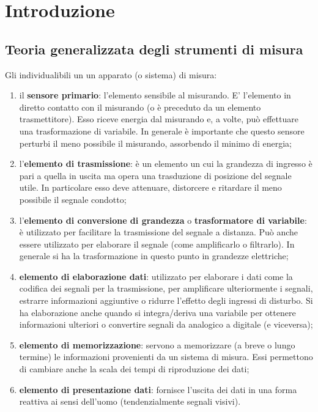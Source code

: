 \chapter{Introduzione}
	
	
	
\section{Teoria generalizzata degli strumenti di misura}
	Gli  individualibili un un apparato (o sistema) di misura:
	\begin{enumerate}
		\item il \textbf{sensore primario}: l'elemento sensibile al misurando. E' l'elemento in diretto contatto con il misurando (o è preceduto da un elemento trasmettitore). Esso riceve energia dal misurando e, a volte, può effettuare una trasformazione di variabile. In generale è importante che questo sensore perturbi il meno possibile il misurando, assorbendo il minimo di energia;
		
		\item l'\textbf{elemento di trasmissione}: è un elemento un cui la grandezza di ingresso è pari a quella in uscita ma opera una trasduzione di posizione del segnale utile. In particolare esso deve attenuare, distorcere e ritardare il meno possibile il segnale condotto;
		
		\item l'\textbf{elemento di conversione di grandezza} o \textbf{trasformatore di variabile}: è utilizzato per facilitare la trasmissione del segnale a distanza. Può anche essere utilizzato per elaborare il segnale (come amplificarlo o filtrarlo). In generale si ha la trasformazione in questo punto in grandezze elettriche;
		
		\item\textbf{ elemento di elaborazione dati}: utilizzato per elaborare i dati come la codifica dei segnali per la trasmissione, per amplificare ulteriormente i segnali, estrarre informazioni aggiuntive o ridurre l'effetto degli ingressi di disturbo. Si ha elaborazione anche quando si integra/deriva una variabile per ottenere informazioni ulteriori o convertire segnali da analogico a digitale (e viceversa);
		
		\item \textbf{elemento di memorizzazione}: servono a memorizzare (a breve o lungo termine) le informazioni provenienti da un sistema di misura. Essi permettono di cambiare anche la scala dei tempi di riproduzione dei dati;
		
		\item \textbf{elemento di presentazione dati}: fornisce l'uscita dei dati in una forma reattiva ai sensi dell'uomo (tendenzialmente segnali visivi).
	\end{enumerate}	